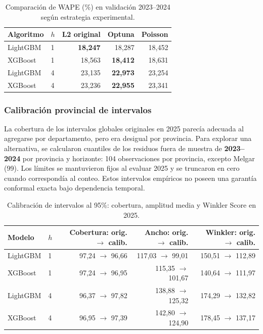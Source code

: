\documentclass[10pt,a4paper]{article}
\begin{document}
\begin{table}[htbp]
\centering
\caption{Comparación de WAPE (\%) en validación 2023--2024 según estrategia experimental.}
\label{tab:optimizacion}
\small
\begin{tabular}{llrrr}
\toprule
\textbf{Algoritmo} & \textbf{$h$} & \textbf{L2 original} & \textbf{Optuna} & \textbf{Poisson}\\
\midrule
LightGBM & 1 & \textbf{18,247} & 18,287 & 18,452\\
XGBoost & 1 & 18,563 & \textbf{18,412} & 18,631\\
LightGBM & 4 & 23,135 & \textbf{22,973} & 23,254\\
XGBoost & 4 & 23,236 & \textbf{22,955} & 23,341\\
\bottomrule
\end{tabular}
\end{table}

\subsubsection{Calibración provincial de intervalos}

La cobertura de los intervalos globales originales en 2025 parecía adecuada al agregarse por departamento, pero era desigual por provincia. Para explorar una alternativa, se calcularon cuantiles de los residuos fuera de muestra de \textbf{2023--2024} por provincia y horizonte: 104 observaciones por provincia, excepto Melgar (99). Los límites se mantuvieron fijos al evaluar 2025 y se truncaron en cero cuando correspondía al conteo. Estos intervalos empíricos no poseen una garantía conformal exacta bajo dependencia temporal.

\begin{table}[htbp]
\centering
\caption{Calibración de intervalos al 95\%: cobertura, amplitud media y Winkler Score en 2025.}
\label{tab:calibracion}
\footnotesize
\setlength{\tabcolsep}{4pt}
\begin{tabular}{llrrr}
\toprule
\textbf{Modelo} & \textbf{$h$} & \textbf{Cobertura: orig. $\to$ calib.} & \textbf{Ancho: orig. $\to$ calib.} & \textbf{Winkler: orig. $\to$ calib.}\\
\midrule
LightGBM & 1 & 97,24 $\to$ 96,66 & 117,03 $\to$ 99,01 & 150,51 $\to$ 112,89\\
XGBoost & 1 & 97,24 $\to$ 96,95 & 115,35 $\to$ 101,67 & 140,64 $\to$ 111,97\\
LightGBM & 4 & 96,37 $\to$ 97,82 & 138,88 $\to$ 125,32 & 174,29 $\to$ 132,82\\
XGBoost & 4 & 96,95 $\to$ 97,39 & 142,80 $\to$ 124,90 & 178,45 $\to$ 137,17\\
\bottomrule
\end{tabular}
\end{table}
\end{document}
